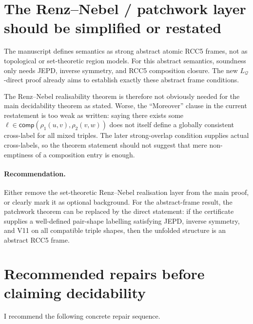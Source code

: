 \documentclass[11pt]{article}
\newcommand{\comp}{\mathsf{comp}}
\newcommand{\Q}{\mathcal Q}
\begin{document}
\section{The Renz--Nebel / patchwork layer should be simplified or restated}

The manuscript defines semantics as strong abstract atomic RCC5 frames, not as
topological or set-theoretic region models.  For this abstract semantics,
soundness only needs JEPD, inverse symmetry, and RCC5 composition closure.  The
new $L_{\Q}$-direct proof already aims to establish exactly these abstract frame
conditions.

The Renz--Nebel realisability theorem is therefore not obviously needed for the
main decidability theorem as stated.  Worse, the ``Moreover'' clause in the
current restatement is too weak as written: saying there exists some
$\ell\in\comp(\rho_1(u,v),\rho_2(v,w))$ does not itself define a globally
consistent cross-label for all mixed triples.  The later strong-overlap
condition supplies actual cross-labels, so the theorem statement should not
suggest that mere non-emptiness of a composition entry is enough.

\paragraph{Recommendation.}
Either remove the set-theoretic Renz--Nebel realisation layer from the main
proof, or clearly mark it as optional background.  For the abstract-frame
result, the patchwork theorem can be replaced by the direct statement:
if the certificate supplies a well-defined pair-shape labelling satisfying JEPD,
inverse symmetry, and V11 on all compatible triple shapes, then the unfolded
structure is an abstract RCC5 frame.

\section{Recommended repairs before claiming decidability}

I recommend the following concrete repair sequence.
\end{document}
